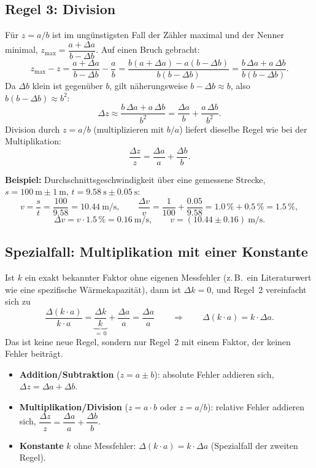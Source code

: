 \documentclass[11pt,a4paper]{article}
\begin{document}
\subsection{Regel 3: Division}
Für $z=a/b$ ist im ungünstigsten Fall der Zähler maximal und der Nenner minimal, $z_{\max}=\dfrac{a+\Delta a}{b-\Delta b}$. Auf einen Bruch gebracht:
\[
  z_{\max}-z = \frac{a+\Delta a}{b-\Delta b} - \frac{a}{b} = \frac{b(a+\Delta a)-a(b-\Delta b)}{b(b-\Delta b)} = \frac{b\,\Delta a+a\,\Delta b}{b(b-\Delta b)}.
\]
Da $\Delta b$ klein ist gegenüber $b$, gilt näherungsweise $b-\Delta b\approx b$, also $b(b-\Delta b)\approx b^2$:
\[
  \Delta z \approx \frac{b\,\Delta a+a\,\Delta b}{b^2} = \frac{\Delta a}{b}+\frac{a\,\Delta b}{b^2}.
\]
Division durch $z=a/b$ (multiplizieren mit $b/a$) liefert dieselbe Regel wie bei der Multiplikation:
\[
  \frac{\Delta z}{z} = \frac{\Delta a}{a}+\frac{\Delta b}{b}.
\]

\textbf{Beispiel:} Durchschnittsgeschwindigkeit über eine gemessene Strecke, $s=100\ \mathrm{m}\pm 1\ \mathrm{m}$, $t=9.58\ \mathrm{s}\pm 0.05\ \mathrm{s}$:
\[
  v = \frac{s}{t} = \frac{100}{9.58} = 10.44\ \mathrm{m/s}, \qquad \frac{\Delta v}{v} = \frac{1}{100}+\frac{0.05}{9.58} = 1.0\,\%+0.5\,\% = 1.5\,\%,
\]
\[
  \Delta v = v\cdot 1.5\,\% = 0.16\ \mathrm{m/s}, \qquad v = (10.44\pm 0.16)\ \mathrm{m/s}.
\]

\subsection{Spezialfall: Multiplikation mit einer Konstante}
Ist $k$ ein exakt bekannter Faktor ohne eigenen Messfehler (z.\,B.\ ein Literaturwert wie eine spezifische Wärmekapazität), dann ist $\Delta k=0$, und Regel~2 vereinfacht sich zu
\[
  \frac{\Delta(k\cdot a)}{k\cdot a} = \underbrace{\frac{\Delta k}{k}}_{=\,0}+\frac{\Delta a}{a} = \frac{\Delta a}{a} \qquad\Longrightarrow\qquad \Delta(k\cdot a) = k\cdot \Delta a.
\]
Das ist keine neue Regel, sondern nur Regel~2 mit einem Faktor, der keinen Fehler beiträgt.

\begin{tippbox}
\begin{itemize}
  \item \textbf{Addition/Subtraktion} ($z=a\pm b$): absolute Fehler addieren sich, $\Delta z=\Delta a+\Delta b$.
  \item \textbf{Multiplikation/Division} ($z=a\cdot b$ oder $z=a/b$): relative Fehler addieren sich, $\dfrac{\Delta z}{z}=\dfrac{\Delta a}{a}+\dfrac{\Delta b}{b}$.
  \item \textbf{Konstante} $k$ ohne Messfehler: $\Delta(k\cdot a) = k\cdot\Delta a$ (Spezialfall der zweiten Regel).
\end{itemize}
\end{tippbox}
\end{document}
